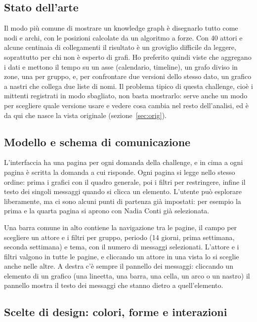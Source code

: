 \documentclass[11pt,a4paper]{article}
\begin{document}
\subsection{Stato dell'arte}
Il modo più comune di mostrare un knowledge graph è disegnarlo tutto come nodi e archi, con le posizioni
calcolate da un algoritmo a forze. Con 40 attori e alcune centinaia di collegamenti il risultato è un groviglio
difficile da leggere, soprattutto per chi non è esperto di grafi. Ho preferito quindi viste che aggregano i dati
e mettono il tempo su un asse (calendario, timeline), un grafo diviso in zone, una per gruppo, e, per
confrontare due versioni dello stesso dato, un grafico a nastri che collega due liste di nomi. Il problema
tipico di questa challenge, cioè i mittenti registrati in modo sbagliato, non basta mostrarlo: serve anche un
modo per scegliere quale versione usare e vedere cosa cambia nel resto dell'analisi, ed è da qui che nasce la
vista originale (sezione~\ref{sec:orig}).

\subsection{Modello e schema di comunicazione}
L'interfaccia ha una pagina per ogni domanda della challenge, e in cima a ogni pagina è scritta la domanda a
cui risponde. Ogni pagina si legge nello stesso ordine: prima i grafici con il quadro generale, poi i filtri
per restringere, infine il testo dei singoli messaggi quando si clicca un elemento. L'utente può esplorare
liberamente, ma ci sono alcuni punti di partenza già impostati: per esempio la prima e la quarta pagina si aprono con Nadia Conti già
selezionata.

Una barra comune in alto contiene la navigazione tra le pagine, il campo per scegliere un attore e i filtri
per gruppo, periodo (14 giorni, prima settimana, seconda settimana) e tema, con il numero di messaggi
selezionati. L'attore e i filtri valgono in tutte le pagine, e cliccando un attore in una vista lo si sceglie
anche nelle altre. A destra c'è sempre il pannello dei messaggi: cliccando un elemento di un grafico (una
lineetta, una barra, una cella, un arco o un nastro) il pannello mostra il testo dei messaggi che stanno dietro
a quell'elemento.

\subsection{Scelte di design: colori, forme e interazioni}
\end{document}
